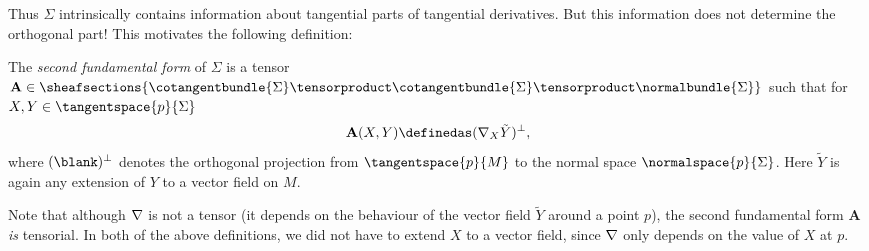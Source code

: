 \documentclass[titlepage,numbers=noenddot,headinclude,oneside,%
footinclude=true,cleardoublepage=empty,%
BCOR=5mm,paper=a4,fontsize=11pt,%
english,%
]{scrartcl}
\newcommand{\todomark}{%
    \colorbox{purple}{%
        \textnormal\ttfamily\bfseries\color{white}%
        TODO%
    }%
}
\newcommand{\todo}[1][]{%
    \ifstrempty{#1}{%
        \def\todotext{Todo}%
    }{%
        \def\todotext{Todo: #1}%
    }%
    \todomark%
    {%
        \marginpar{%
            \raggedright\normalfont\sffamily\scriptsize\todotext%
        }%
    }%
}
\begin{document}
{\begin{fact}
\end{fact}
Thus \( \Sigma \) intrinsically contains information about tangential parts of tangential derivatives. But this information does not determine the orthogonal part! This motivates the following definition:
\begin{definition}
    The \emph{second fundamental form} of \( \Sigma \) is a tensor \( \mathbf{A}\in \sheafsections{\cotangentbundle{\Sigma}\tensorproduct \cotangentbundle{\Sigma}\tensorproduct \normalbundle{\Sigma}} \) such that for \( X,Y\in \tangentspace{p}{\Sigma} \)
    \begin{equation*}
        \mathbf{A}(X,Y)\definedas (\Mconnection_X \tilde{Y})^\perp,
    \end{equation*}
    where \( (\blank)^\perp \) denotes the orthogonal projection from \( \tangentspace{p}{M} \) to the normal space \( \normalspace{p}{\Sigma} \). Here \( \tilde{Y} \) is again any extension of \( Y \) to a vector field on \( M \).
\end{definition}  
Note that although \( \nabla \) is not a tensor (\ie it depends on the behaviour of the vector field \( \tilde{Y} \) around a point \( p \)), the second fundamental form \( \mathbf{A} \) \emph{is} tensorial. In both of the above definitions, we did not have to extend \( X \) to a vector field, since \( \nabla \) only depends on the value of \( X \) at \( p \).

}
\end{document}
